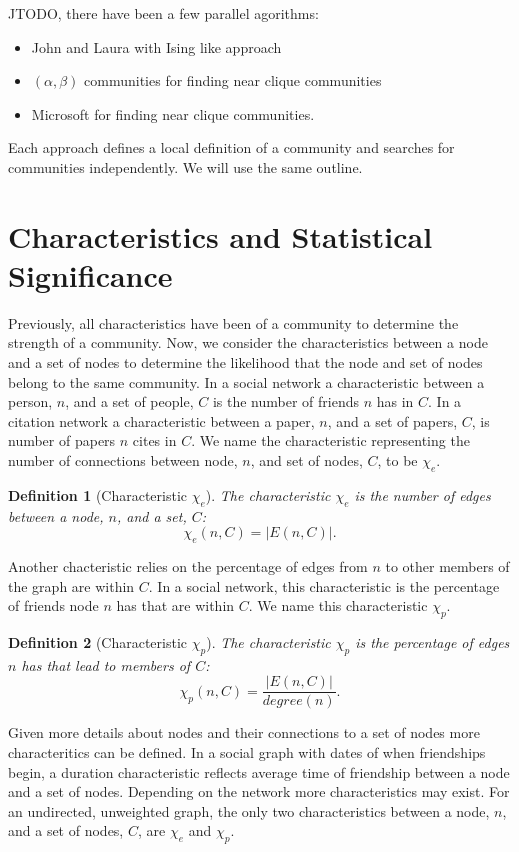 \documentclass[phd,tocprelim]{cornell}
\newtheorem{definition}{Definition}
\begin{document}
JTODO, there have been a few parallel agorithms:

\begin{itemize}
\item John and Laura with Ising like approach
\item $(\alpha, \beta)$ communities for finding near clique communities
\item Microsoft for finding near clique communities.
\end{itemize}

Each approach defines a local definition of a community and searches for communities independently.  We will use the same outline.

\section {Characteristics and Statistical Significance}

Previously, all characteristics have been of a community to determine the strength of a community.  Now, we consider the characteristics between a node and a set of nodes to determine the likelihood that the node and set of nodes belong to the same community.  In a social network a characteristic between a person, $n$, and a set of people, $C$ is the number of friends $n$ has in $C$.  In a citation network a characteristic between a paper, $n$, and a set of papers, $C$, is number of papers $n$ cites in $C$.  We name the characteristic representing the number of connections between node, $n$, and set of nodes, $C$, to be $\chi_e$. 
\begin{definition}[Characteristic $\chi_e$]
The characteristic $\chi_e$ is the number of edges between a node, $n$, and a set, $C$:
\begin{equation}
\chi_e(n, C) = |E(n, C)|.
\end{equation}
\end{definition}
 Another chacteristic relies on the percentage of edges from $n$ to other members of the graph are within $C$.  In a social network, this characteristic is the percentage of friends node $n$ has that are within $C$.  We name this characteristic $\chi_p$.  
\begin{definition}[Characteristic $\chi_p$]
The characteristic $\chi_p$ is the percentage of edges $n$ has that lead to members of $C$:
\begin{equation}
\chi_p(n, C) = \frac{|E(n, C)|}{degree(n)}.
\end{equation}
\end{definition}
Given more details about nodes and their connections to a set of nodes more characteritics can be defined.  In a social graph with dates of when friendships begin, a duration characteristic reflects average time of friendship between a node and a set of nodes.  Depending on the network more characteristics may exist.  For an undirected, unweighted graph, the only two characteristics between a node, $n$, and a set of nodes, $C$, are $\chi_e$ and $\chi_p$. 
\end{document}
